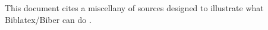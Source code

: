 \documentclass[british,a4paper]{article}
\begin{document}
This document cites a miscellany of sources \autocite[e.g.][]{aristotle:poetics,%
aristotle:anima,aristotle:rhetoric} designed to illustrate what Biblatex/Biber
can do \autocite{cicero,companion}.

\nocite{*}

\printbibliography
\end{document}
